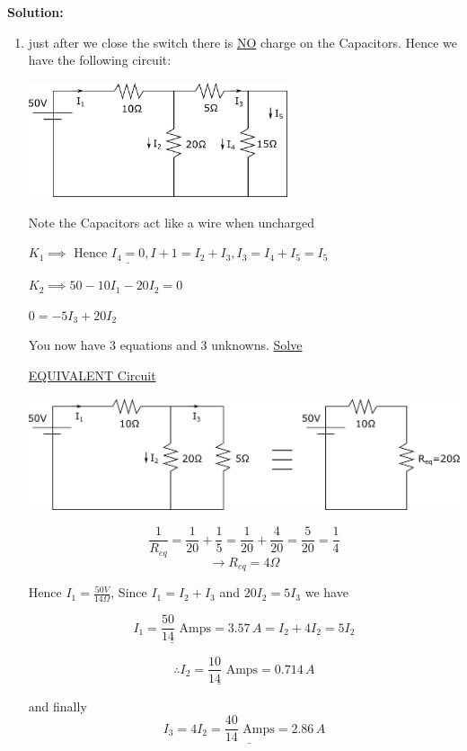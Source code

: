 \textbf{Solution:}\\
\begin{enumerate}
	\item just after we close the switch there is \underline{NO} charge on the Capacitors. Hence we have the following circuit:
	
	\vspace{5mm}
	\includegraphics[width=0.6\textwidth]{Images/P8img2.png}
	
	Note the Capacitors act like a wire when uncharged
	\vspace{5mm}
	
	$K_1 \implies \textrm{ Hence } \underline{I_4=0}, I+1=I_2+I_3, I_3=I_4+I_5=I_5$
	
	$K_2 \implies 50-10I_1-20I_2=0$
	
	$0=-5I_3+20I_2$
	\vspace{5mm}
	
	You now have 3 equations and 3 unknowns. \underline{Solve}
	
	\vspace{5mm}
	
	\underline{EQUIVALENT Circuit}
	
	\includegraphics[width=\linewidth]{Images/P8img3.png}
	
	$$\frac{1}{R_{eq}}=\frac{1}{20}+\frac{1}{5}=\frac{1}{20}+\frac{4}{20}=\frac{5}{20}=\frac{1}{4}$$
	$$\rightarrow R_{eq}=4\Omega$$
	
	Hence $I_1=\frac{50V}{14\Omega}$, Since $I_1=I_2+I_3$ and $20I_2=5I_3$ we have
	
	$$\underline{I_1=\frac{50}{14}\text{ Amps}}=3.57\,A=I_2+4I_2=5I_2$$
	
	$$\therefore\underline{I_2=\frac{10}{14}\textrm{ Amps}}=0.714\,A$$
	
	and finally $$I_3=4I_2=\underline{\frac{40}{14}\textrm{ Amps}}=2.86\,A$$
	

\end{enumerate}
